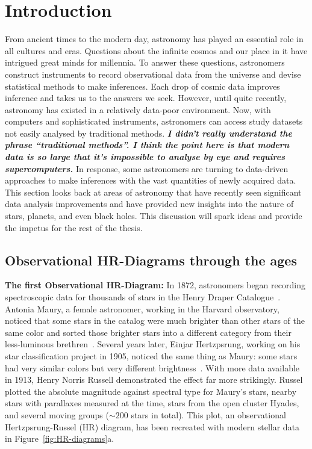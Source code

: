  \chapter{Introduction}
\label{cp.intro}

From ancient times to the modern day, astronomy has played an essential role in all cultures and eras.
Questions about the infinite cosmos and our place in it have intrigued great minds for millennia.
To answer these questions, astronomers construct instruments to record observational data from the universe and devise statistical methods to make inferences.
Each drop of cosmic data improves inference and takes us to the answers we seek.
However, until quite recently, astronomy has existed in a relatively data-poor environment. 
Now, with computers and sophisticated instruments, astronomers can access study datasets not easily analysed by traditional methods. \textit{\textbf{I didn't really understand the phrase ``traditional methods''. I think the point here is that modern data is so large that it's impossible to analyse by eye and requires supercomputers.}}
In response, some astronomers are turning to data-driven approaches to make inferences with the vast quantities of newly acquired data.
This section looks back at areas of astronomy that have recently seen significant data analysis improvements and have provided new insights into the nature of stars, planets, and even black holes.
This discussion will spark ideas and provide the impetus for the rest of the thesis.


\section{Observational HR-Diagrams through the ages}

\textbf{The first Observational HR-Diagram:}
In 1872, astronomers began recording spectroscopic data for thousands of stars in the Henry Draper Catalogue~\cite{Cannon:1918:AnHar}.
Antonia Maury, a female astronomer, working in the Harvard observatory, noticed that some stars in the catalog were much brighter than other stars of the same color and sorted those brighter stars into a different category from their less-luminous brethren~\cite{1914_HR_data}. 
Several years later, Einjar Hertzpsrung, working on his star classification project in 1905, noticed the same thing as Maury: some stars had very similar colors but very different brightness~\cite{1914_HR_data}.
With more data available in 1913, Henry Norris Russell demonstrated the effect far more strikingly. 
Russel plotted the absolute magnitude against spectral type for Maury's stars, nearby stars with parallaxes measured at the time, stars from the open cluster Hyades, and several moving groups ($\sim200$ stars in total). 
This plot, an observational Hertzpsrung-Russel (HR) diagram, has been recreated with modern stellar data in Figure~\ref{fig:HR-diagrams}a.

